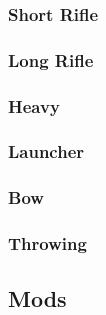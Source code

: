 \documentclass[12pt,a4paper,openany]{book}
\begin{document}
	\subsubsection{Short Rifle}
	\subsubsection{Long Rifle}
	\subsubsection{Heavy}
	\subsubsection{Launcher}
	\subsubsection{Bow}
	\subsubsection{Throwing}
	\subsection{Mods}
\end{document}
